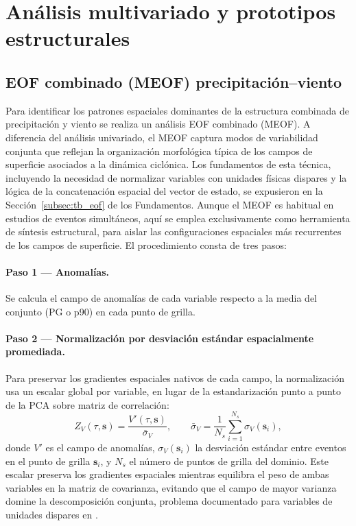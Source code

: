 \section{Análisis multivariado y prototipos estructurales}\label{sec:meof_prototipos}

\subsection{EOF combinado (MEOF) precipitación--viento}\label{subsec:eof_multivariado}

Para identificar los patrones espaciales dominantes de la estructura combinada de precipitación y viento se realiza un análisis EOF combinado (MEOF). A diferencia del análisis univariado, el MEOF captura modos de variabilidad conjunta que reflejan la organización morfológica típica de los campos de superficie asociados a la dinámica ciclónica. Los fundamentos de esta técnica, incluyendo la necesidad de normalizar variables con unidades físicas dispares y la lógica de la concatenación espacial del vector de estado, se expusieron en la Sección~\ref{subsec:tb_eof} de los Fundamentos. Aunque el MEOF es habitual en estudios de eventos simultáneos, aquí se emplea exclusivamente como herramienta de síntesis estructural, para aislar las configuraciones espaciales más recurrentes de los campos de superficie. El procedimiento consta de tres pasos:

\paragraph{Paso 1 — Anomalías.} Se calcula el campo de anomalías de cada variable respecto a la media del conjunto (PG o p90) en cada punto de grilla.

\paragraph{Paso 2 — Normalización por desviación estándar espacialmente promediada.} Para preservar los gradientes espaciales nativos de cada campo, la normalización usa un escalar global por variable, en lugar de la estandarización punto a punto de la PCA sobre matriz de correlación:
\begin{equation}\label{eq:meof_normalizacion}
    Z_{V}(\tau, \mathbf{s}) =
        \frac{V'(\tau, \mathbf{s})}{\bar{\sigma}_{V}},
    \qquad
    \bar{\sigma}_{V} = \frac{1}{N_s} \sum_{i=1}^{N_s} \sigma_{V}(\mathbf{s}_i),
\end{equation}
donde $V'$ es el campo de anomalías, $\sigma_{V}(\mathbf{s}_i)$ la desviación estándar entre eventos en el punto de grilla $\mathbf{s}_i$, y $N_s$ el número de puntos de grilla del dominio. Este escalar preserva los gradientes espaciales mientras equilibra el peso de ambas variables en la matriz de covarianza, evitando que el campo de mayor varianza domine la descomposición conjunta, problema documentado para variables de unidades dispares en \citet{wilks2019statistical_ch13}.

